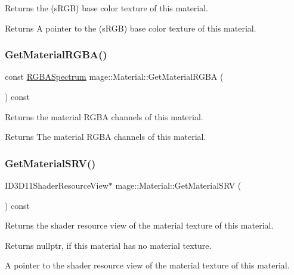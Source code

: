 Returns the (s\+R\+GB) base color texture of this material.

\begin{DoxyReturn}{Returns}
A pointer to the (s\+R\+GB) base color texture of this material. 
\end{DoxyReturn}
\hypertarget{structmage_1_1_material_a079997ddbe4a482f1d802bc537329318}{}\label{structmage_1_1_material_a079997ddbe4a482f1d802bc537329318} 
\subsubsection{\texorpdfstring{Get\+Material\+R\+G\+B\+A()}{GetMaterialRGBA()}}
{\footnotesize\ttfamily const \hyperlink{structmage_1_1_r_g_b_a_spectrum}{R\+G\+B\+A\+Spectrum} mage\+::\+Material\+::\+Get\+Material\+R\+G\+BA (\begin{DoxyParamCaption}{ }\end{DoxyParamCaption}) const\hspace{0.3cm}{\ttfamily [noexcept]}}

Returns the material R\+G\+BA channels of this material.

\begin{DoxyReturn}{Returns}
The material R\+G\+BA channels of this material. 
\end{DoxyReturn}
\hypertarget{structmage_1_1_material_a0675c4bbbdb48c0db9bf82fffb073094}{}\label{structmage_1_1_material_a0675c4bbbdb48c0db9bf82fffb073094} 
\subsubsection{\texorpdfstring{Get\+Material\+S\+R\+V()}{GetMaterialSRV()}}
{\footnotesize\ttfamily I\+D3\+D11\+Shader\+Resource\+View$\ast$ mage\+::\+Material\+::\+Get\+Material\+S\+RV (\begin{DoxyParamCaption}{ }\end{DoxyParamCaption}) const\hspace{0.3cm}{\ttfamily [noexcept]}}

Returns the shader resource view of the material texture of this material.

\begin{DoxyReturn}{Returns}
{\ttfamily nullptr}, if this material has no material texture. 

A pointer to the shader resource view of the material texture of this material. 
\end{DoxyReturn}
\hypertarget{structmage_1_1_material_aa8accf832423420f6b2ed4b50ef394b3}{}\label{structmage_1_1_material_aa8accf832423420f6b2ed4b50ef394b3} 
